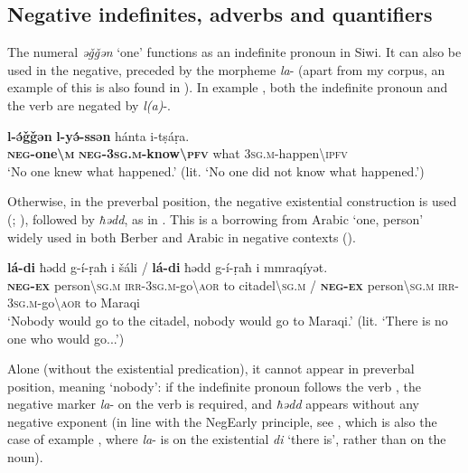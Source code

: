\documentclass[output=paper,colorlinks,citecolor=brown]{langscibook}
\begin{document}
\subsection{Negative indefinites, adverbs and quantifiers}\label{sec:siw:3.2}

The numeral \textit{əǧǧən} ‘one’ functions as an indefinite pronoun in Siwi. It can also be used in the negative, preceded by the morpheme \textit{la}{}- (apart from my corpus, an example of this is also found in \citealt[80]{Walker1921}). In example , both the indefinite pronoun and the verb are negated by \textit{l(a)}{}-.

\ea\label{ex:siw:47}
    \gll \textbf{l-ə́ǧǧən} \textbf{l-yə́-ssən} hánta i-tṣáṛa. \\
         \textbf{\textsc{neg}-one{\textbackslash}\textsc{m}} \textbf{\textsc{neg}-\textsc{3sg.m}-know{\textbackslash}\textsc{pfv}} what \textsc{3sg.m}-happen{\textbackslash}\textsc{ipfv} \\
    \glt ‘No one knew what happened.’ (lit. ‘No one did not know what happened.’)
\z

Otherwise, in the preverbal position, the negative existential construction is used (\citealt{Haspelmath1997}; \citealt{Veselinova2013neg.exist}), followed by \textit{ħədd}, as in . This is a borrowing from Arabic ‘one, person’ widely used in both Berber and Arabic in negative contexts (\citealt{ChakerCaubet1996}).

\ea\label{ex:siw:48}
    \gll \textbf{lá-di} ħədd g-í-ṛaħ i šáli / \textbf{lá-di} ħədd g-í-ṛaħ i mmraqíyət. \\
         \textbf{\textsc{neg-ex}} person{\textbackslash}\textsc{sg.m} \textsc{irr-3sg.m}-go{\textbackslash}\textsc{aor} to citadel{\textbackslash}\textsc{sg.m} / \textbf{\textsc{neg-ex}} person{\textbackslash}\textsc{sg.m} \textsc{irr-3sg.m}-go{\textbackslash}\textsc{aor} to Maraqi \\
    \glt ‘Nobody would go to the citadel, nobody would go to Maraqi.’ (lit. ‘There is no one who would go...’)
\z

Alone (without the existential predication), it cannot appear in preverbal position, meaning ‘nobody’: if the indefinite pronoun follows the verb , the negative marker \textit{la}{}- on the verb is required, and \textit{ħədd} appears without any negative exponent (in line with the NegEarly principle, see \citealt{AuweraAlsenoy2016}, which is also the case of example , where \textit{la}{}- is on the existential \textit{di} ‘there is’, rather than on the noun).
\end{document}
